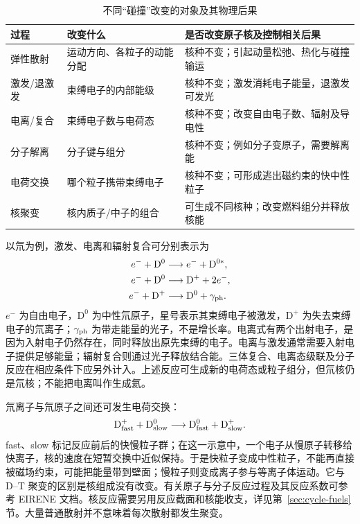 \documentclass[12pt,fontset=none]{ctexart}
\numberwithin{equation}{section}
\numberwithin{table}{section}
\numberwithin{figure}{section}
\begin{document}
\begin{table}[htbp]
\centering\small
\caption{不同``碰撞''改变的对象及其物理后果}\label{tab:micro-reactions}
\begin{tabular}{L{2.3cm}L{4.2cm}L{7.0cm}}
\toprule
过程 & 改变什么 & 是否改变原子核及控制相关后果 \\
\midrule
弹性散射 & 运动方向、各粒子的动能分配 & 核种不变；引起动量松弛、热化与碰撞输运 \\
激发/退激发 & 束缚电子的内部能级 & 核种不变；激发消耗电子能量，退激发可发光 \\
电离/复合 & 束缚电子数与电荷态 & 核种不变；改变自由电子数、辐射及导电性 \\
分子解离 & 分子键与组分 & 核种不变；例如分子变原子，需要解离能 \\
电荷交换 & 哪个粒子携带束缚电子 & 核种不变；可形成逃出磁约束的快中性粒子 \\
核聚变 & 核内质子/中子的组合 & 可生成不同核种；改变燃料组分并释放核能 \\
\bottomrule
\end{tabular}
\end{table}

以氘为例，激发、电离和辐射复合可分别表示为
\begin{align}
 e^-+\mathrm D^0&\longrightarrow e^-+\mathrm D^{0*},\label{eq:micro-excitation}\\
 e^-+\mathrm D^0&\longrightarrow \mathrm D^++2e^-,\label{eq:micro-ionization}\\
 e^-+\mathrm D^+&\longrightarrow \mathrm D^0+\gamma_{\rm ph}.\label{eq:micro-recombination}
\end{align}
$e^-$ 为自由电子，$\mathrm D^0$ 为中性氘原子，星号表示其束缚电子被激发，$\mathrm D^+$ 为失去束缚电子的氘离子；$\gamma_{\rm ph}$ 为带走能量的光子，不是增长率。电离式有两个出射电子，是因为入射电子仍然存在，同时释放出原先束缚的电子。电离与激发通常需要入射电子提供足够能量；辐射复合则通过光子释放结合能。三体复合、电离态级联及分子反应在相应条件下应另外计入。上述反应可生成新的电荷态或粒子组分，但氘核仍是氘核；不能把电离叫作生成氦。

氘离子与氘原子之间还可发生电荷交换：
\begin{equation}\label{eq:micro-cx}
 \mathrm D^+_{\rm fast}+\mathrm D^0_{\rm slow}
 \longrightarrow\mathrm D^0_{\rm fast}+\mathrm D^+_{\rm slow}.
\end{equation}
fast、slow 标记反应前后的快慢粒子群；在这一示意中，一个电子从慢原子转移给快离子，核的速度在短暂交换中近似保持。于是快粒子变成中性粒子，不能再直接被磁场约束，可能把能量带到壁面；慢粒子则变成离子参与等离子体运动。它与 D--T 聚变的区别是核组成没有改变。有关原子与分子反应过程及其反应系数可参考 EIRENE 文档\cite{Patomic}。核反应需要另用反应截面和核能收支，详见第~\ref{sec:cycle-fuels} 节。大量普通散射并不意味着每次散射都发生聚变。
\end{document}
